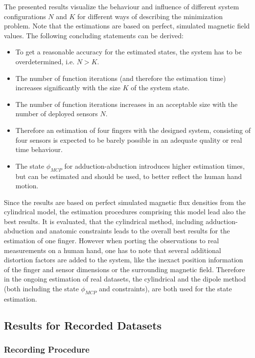 The presented results visualize the behaviour and influence of different system configurations $ N $ and $ K $ for different ways of describing the minimization problem. Note that the estimations are based on perfect, simulated magnetic field values. The following concluding statements can be derived:
\begin{itemize}
\item To get a reasonable accuracy for the estimated states, the system has to be overdetermined, i.e. $ N > K $.
\item The number of function iterations (and therefore the estimation time) increases significantly with the size $ K $ of the system state.
\item The number of function iterations increases in an acceptable size with the number of deployed sensors $ N $.
\item Therefore an estimation of four fingers with the designed system, consisting of four sensors is expected to be barely possible in an adequate quality or real time behaviour.
\item The state $ \phi_{MCP} $ for adduction-abduction introduces higher estimation times, but can be estimated and should be used, to better reflect the human hand motion.
\end{itemize}
Since the results are based on perfect simulated magnetic flux densities from the cylindrical model, the estimation procedures comprising this model lead also the best results. It is evaluated, that the cylindrical method, including adduction-abduction and anatomic constraints leads to the overall best results for the estimation of one finger. However when porting the observations to real measurements on a human hand, one has to note that several additional distortion factors are added to the system, like the inexact position information of the finger and sensor dimensions or the surrounding magnetic field. Therefore in the ongoing estimation of real datasets, the cylindrical and the dipole method (both including the state $ \phi_{MCP} $ and constraints), are both used for the state estimation.

\FloatBarrier
\subsection{Results for Recorded Datasets} \label{subsec:resMeas}

\subsubsection{Recording Procedure}\label{subsubsec:recSetup}


